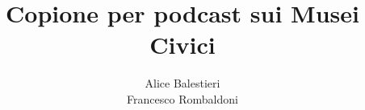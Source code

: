\documentclass[hidelinks,12pt,a4paper]{article}
\begin{document}
	\begin{flushleft}
		
		\LARGE
		
		\title{\textbf{Copione per podcast sui Musei Civici}}
		\author{Alice Balestieri\\Francesco Rombaldoni}
		\date{}
		
		\maketitle
		
		\setcounter{page}{1}
		\newpage
		
		\tableofcontents
		\newpage
		
		
		\vspace*{\fill}
		\doclicenseThis
	\end{flushleft}
\end{document}
